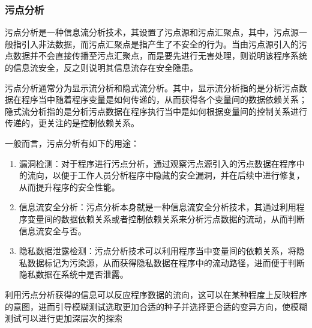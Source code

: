 \subsubsection{污点分析}

污点分析是一种信息流分析技术，其设置了污点源和污点汇聚点，其中，污点源一般指引入非法数据，而污点汇聚点是指产生了不安全的行为。当由污点源引入的污点数据并不会直接传播至污点汇聚点，而是要先进行无害处理，则说明该程序系统的信息流安全，反之则说明其信息流存在安全隐患。

污点分析通常分为显示流分析和隐式流分析。其中，显示流分析指的是分析污点数据在程序当中随着程序变量是如何传递的，从而获得各个变量间的数据依赖关系；隐式流分析指的是分析污点数据在程序执行当中是如何根据变量间的控制关系进行传递的，更关注的是控制依赖关系。

一般而言，污点分析有如下的用途：
\begin{enumerate}
\item 漏洞检测：对于程序进行污点分析，通过观察污点源引入的污点数据在程序中的流向，以便于工作人员分析程序中隐藏的安全漏洞，并在后续中进行修复，从而提升程序的安全性能。
\item 信息流安全分析：污点分析本身就是一种信息流安全分析技术，其通过利用程序变量间的数据依赖关系或者控制依赖关系来分析污点数据的流动，从而判断信息流安全与否。
\item 隐私数据泄露检测：污点分析技术可以利用程序当中变量间的依赖关系，将隐私数据标记为污染源，从而获得隐私数据在程序中的流动路径，进而便于判断隐私数据在系统中是否泄露。
\end{enumerate}

利用污点分析获得的信息可以反应程序数据的流向，这可以在某种程度上反映程序的意图，进而引导模糊测试选取更加合适的种子并选择更合适的变异方向，使模糊测试可以进行更加深层次的探索\cite{gan2020greyone}